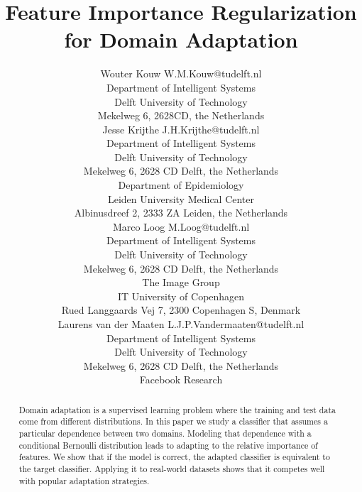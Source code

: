 \documentclass[twoside,11pt]{article}
\begin{document}
\title{Feature Importance Regularization \\ for Domain Adaptation}

\author{\name Wouter Kouw \email W.M.Kouw@tudelft.nl \\
       \addr Department of Intelligent Systems\\
       Delft University of Technology\\
       Mekelweg 6, 2628CD, the Netherlands \\
       \AND
       \name Jesse Krijthe \email J.H.Krijthe@tudelft.nl \\
       \addr Department of Intelligent Systems\\
       Delft University of Technology\\
       Mekelweg 6, 2628 CD Delft, the Netherlands \\
       \addr Department of Epidemiology \\
       Leiden University Medical Center \\
       Albinusdreef 2, 2333 ZA Leiden, the Netherlands \\
       \AND
       \name Marco Loog \email M.Loog@tudelft.nl \\
       \addr Department of Intelligent Systems\\
       Delft University of Technology\\
       Mekelweg 6, 2628 CD Delft, the Netherlands \\
       \addr The Image Group \\
	IT University of Copenhagen \\
	Rued Langgaards Vej 7, 2300 Copenhagen S, Denmark \\
       \AND
       \name Laurens van der Maaten \email L.J.P.Vandermaaten@tudelft.nl \\
       \addr Department of Intelligent Systems\\
       Delft University of Technology\\
       Mekelweg 6, 2628 CD Delft, the Netherlands \\
	\addr Facebook Research
}


\maketitle

\begin{abstract}%
Domain adaptation is a supervised learning problem where the training and test data come from different distributions. In this paper we study a classifier that assumes a particular dependence between two domains. Modeling that dependence with a conditional Bernoulli	 distribution leads to adapting to the relative importance of features. We show that if the model is correct, the adapted classifier is equivalent to the target classifier. Applying it to real-world datasets shows that it competes well with popular adaptation strategies.
\end{abstract}
\end{document}
